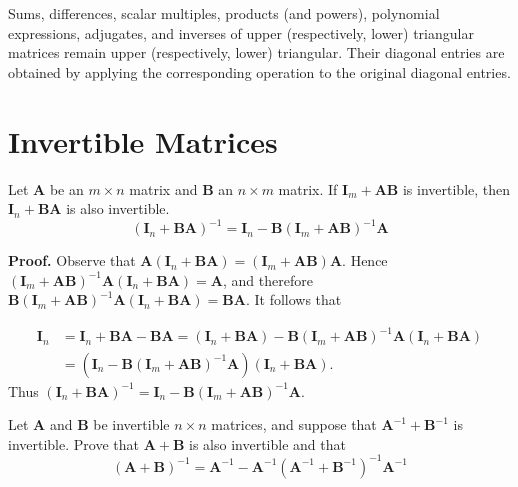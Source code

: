 \documentclass[12pt, a4paper, oneside]{book}
\begin{document}
\begin{theorem}
    Sums, differences, scalar multiples, products (and powers), polynomial expressions, adjugates, and inverses of upper (respectively, lower) triangular matrices remain upper (respectively, lower) triangular. Their diagonal entries are obtained by applying the corresponding operation to the original diagonal entries.
\end{theorem}




\section{Invertible Matrices}
\begin{theorem}
    Let $\mathbf{A}$ be an $m \times n$ matrix and $\mathbf{B}$ an $n \times m$ matrix. If $\mathbf{I}_m+{\mathbf{A} \mathbf{B}}$ is invertible, then $\mathbf{I}_n+\mathbf{B} \mathbf{A}$ is also invertible.
    \[
        \left(\mathbf{I}_n+\mathbf{B} \mathbf{A}\right)^{-1}=\mathbf{I}_n-\mathbf{B}\left(\mathbf{I}_m+\mathbf{A} \mathbf{B}\right)^{-1} \mathbf{A}
    \]

    \textbf{Proof.}
    Observe that $\mathbf{A}\left(\mathbf{I}_n+\mathbf{B} \mathbf{A}\right)=\left(\mathbf{I}_m+\mathbf{A} \mathbf{B}\right) \mathbf{A}$. Hence $\left(\mathbf{I}_m+\mathbf{A} \mathbf{B}\right)^{-1} \mathbf{A}\left(\mathbf{I}_n+\mathbf{B} \mathbf{A}\right)=\mathbf{A}$, and therefore $\mathbf{B}\left(\mathbf{I}_m+\mathbf{A} \mathbf{B}\right)^{-1} \mathbf{A}\left(\mathbf{I}_n+\mathbf{B} \mathbf{A}\right)=\mathbf{B} \mathbf{A}$. It follows that

    \[
        \begin{aligned}
            \mathbf{I}_n & =\mathbf{I}_n+{\mathbf{B} \mathbf{A}}-\mathbf{B} \mathbf{A}=\left(\mathbf{I}_n+{\mathbf{B} \mathbf{A}}\right)-\mathbf{B}\left(\mathbf{I}_m+{\mathbf{A} \mathbf{B}}\right)^{-1} \mathbf{A}\left(\mathbf{I}_n+{\mathbf{B} \mathbf{A}}\right) \\
                         & =\left(\mathbf{I}_n-\mathbf{B}\left(\mathbf{I}_m+{\mathbf{A} \mathbf{B}}\right)^{-1} \mathbf{A}\right)\left(\mathbf{I}_n+{\mathbf{B} \mathbf{A}}\right) .
        \end{aligned}
    \]
    Thus $\left(\mathbf{I}_n+\mathbf{B} \mathbf{A}\right)^{-1}=\mathbf{I}_n-\mathbf{B}\left(\mathbf{I}_m+\mathbf{A} \mathbf{B}\right)^{-1} \mathbf{A}$.
\end{theorem}

\begin{corollary}
    Let $\mathbf{A}$ and $\mathbf{B}$ be invertible $n \times n$ matrices, and suppose that $\mathbf{A}^{-1}+\mathbf{B}^{-1}$ is invertible. Prove that $\mathbf{A}+\mathbf{B}$ is also invertible and that
    \[
        (\mathbf{A}+\mathbf{B})^{-1}=\mathbf{A}^{-1}-\mathbf{A}^{-1}\left(\mathbf{A}^{-1}+\mathbf{B}^{-1}\right)^{-1} \mathbf{A}^{-1}
    \]
\end{corollary}
\end{document}
